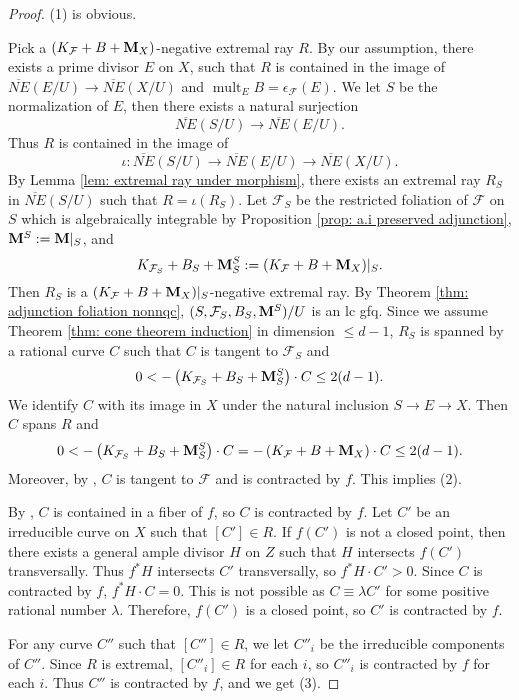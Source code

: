 \documentclass[11pt]{amsart}
\numberwithin{equation}{section}
\newcommand{\Mm}{{\bf{M}}}
\newcommand{\mult}{\operatorname{mult}}
\newcommand{\Ff}{\mathcal{F}}
\theoremstyle{definition}
\theoremstyle{definition}
\theoremstyle{definition}
\begin{document}
\begin{proof}
(1) is obvious.

Pick a $(K_{\Ff}+B+\Mm_X)$-negative extremal ray $R$. By our assumption, there exists a prime divisor $E$ on $X$, such that $R$ is contained in the image of $\overline{NE}(E/U)\rightarrow\overline{NE}(X/U)$ and $\mult_EB=\epsilon_{\Ff}(E)$. We let $S$ be the normalization of $E$, then there exists a natural surjection
$$\overline{NE}(S/U)\rightarrow\overline{NE}(E/U).$$ 
Thus $R$ is contained in the image of 
$$\iota: \overline{NE}(S/U)\rightarrow\overline{NE}(E/U)\rightarrow\overline{NE}(X/U).$$ 
By Lemma \ref{lem: extremal ray under morphism}, there exists an extremal ray $R_S$ in $\overline{NE}(S/U)$ such that $R=\iota(R_S)$. 
Let $\Ff_S$ be the restricted foliation of $\Ff$ on $S$ which is algebraically integrable by Proposition \ref{prop: a.i preserved adjunction}, $\Mm^S:=\Mm|_S$, and
$$K_{\Ff_S}+B_S+\Mm^S_S:=(K_{\Ff}+B+\Mm_X)|_S.$$
Then $R_S$ is a $(K_{\Ff}+B+\Mm_X)|_S$-negative extremal ray. By Theorem \ref{thm: adjunction foliation nonnqc}, $(S,\Ff_S,B_S,\Mm^S)/U$ is an lc gfq. Since we assume Theorem \ref{thm: cone theorem induction} in dimension $\leq d-1$, $R_S$ is spanned by a rational curve $C$ such that $C$ is tangent to $\Ff_S$ and
$$0<-\left(K_{\Ff_S}+B_S+\Mm^S_S\right)\cdot C\leq 2(d-1).$$
We identify $C$ with its image in $X$ under the natural inclusion $S\rightarrow E\rightarrow X$. Then $C$ spans $R$ and
$$0<-\left(K_{\Ff_S}+B_S+\Mm^S_S\right)\cdot C=-\left(K_{\Ff}+B+\Mm_X\right)\cdot C\leq 2(d-1).$$
Moreover, by \cite[Lemma 3.3(4)]{ACSS21}, $C$ is tangent to $\Ff$ and is contracted by $f$. This implies (2). 

By \cite[Lemma 3.3(3)]{ACSS21}, $C$ is contained in a fiber of $f$, so $C$ is contracted by $f$. Let $C'$ be an irreducible curve on $X$ such that $[C']\in R$. If $f(C')$ is not a closed point, then there exists a general ample divisor $H$ on $Z$ such that $H$ intersects $f(C')$ transversally. Thus $f^*H$ intersects $C'$ transversally, so $f^*H\cdot C'>0$. Since $C$ is contracted by $f$, $f^*H\cdot C=0$. This is not possible as $C\equiv\lambda C'$ for some positive rational number $\lambda$. Therefore, $f(C')$ is a closed point, so $C'$ is contracted by $f$.

For any curve $C''$ such that $[C'']\in R$, we let $C''_i$ be the irreducible components of $C''$. Since $R$ is extremal, $[C''_i]\in R$ for each $i$, so $C''_i$ is contracted by $f$ for each $i$. Thus $C''$ is contracted by $f$, and we get (3).


\end{proof}
\end{document}
